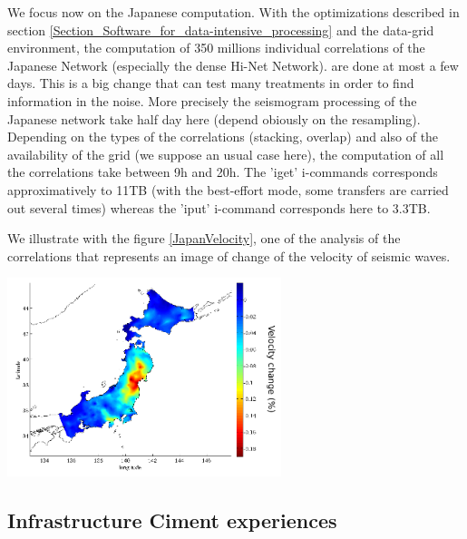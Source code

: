 \documentclass[a4paper, 10pt]{article}
\begin{document}
\begin{multicols}{2}
We focus now on the Japanese computation. With the optimizations described in section \ref{Section_Software_for_data-intensive_processing} 
and the data-grid environment, the computation of 350 millions individual correlations of the Japanese Network (especially the dense Hi-Net Network). 
are done at most a few days. This is a big change that can test many treatments in order to find information in the noise.
More precisely the seismogram processing of the Japanese network take half day here (depend obiously on the resampling).
Depending on the types of the correlations (stacking, overlap) and also of the availability of the grid (we suppose an usual case here), 
the computation of all the correlations take between 9h and 20h. The 'iget' i-commands corresponds approximatively to 11TB (with the best-effort mode,
some transfers are carried out several times) whereas the 'iput' i-command corresponds here to 3.3TB. 


We illustrate with the figure \ref{JapanVelocity}, one of the analysis of the correlations that represents an image
of change of the velocity of seismic waves.
\begin{center}%
\centering
{}
\includegraphics[width=8cm]{JapanVelocity.png}
\end{center}


\subsection{Infrastructure Ciment experiences}


\end{multicols}
\end{document}
